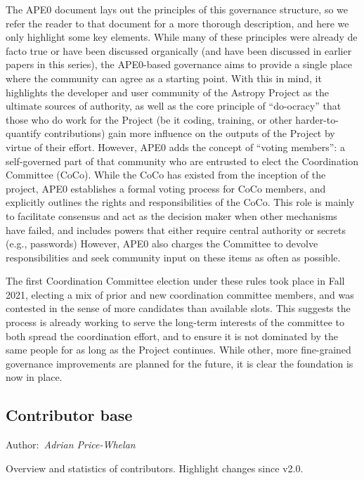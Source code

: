 \documentclass[modern]{aastex631}
\newcommand{\secauthor}[1]{{\color{blue}Author:~\textit{#1}}}
\begin{document}
The APE0 \citep{ape0} document lays out the principles of this governance
structure, so we refer the reader to that document for a more thorough
description, and here we only highlight some key elements. While many of these
principles were already de facto true or have been discussed organically (and
have been discussed in earlier papers in this series), the APE0-based governance
aims to provide a single place where the community can agree as a starting
point. With this in mind, it highlights the developer and user community of the
Astropy Project as the ultimate sources of authority, as well as the core
principle of ``do-ocracy'' that those who do work for the Project (be it coding,
training, or other harder-to-quantify contributions) gain more influence on the
outputs of the Project by virtue of their effort. However, APE0 adds the
concept of ``voting members'': a self-governed part of that community who are
entrusted to elect the Coordination Committee (CoCo). While the CoCo has existed
from the inception of the project, APE0 establishes a formal voting process for
CoCo members, and explicitly outlines the rights and responsibilities of the
CoCo. This role is mainly to facilitate consensus and act as the decision maker
when other mechanisms have failed, and includes powers that either
require central authority or secrets (e.g., passwords) However, APE0 also
charges the Committee to devolve responsibilities and seek community input on
these items as often as possible.

The first Coordination Committee election under these rules took place in Fall
2021, electing a mix of prior and new coordination committee members,
and was contested in the sense of more candidates than available slots. This
suggests the process is already working to serve the long-term interests of the
committee to both spread the coordination effort, and to ensure it is not
dominated by the same people for as long as the Project continues. While other,
more fine-grained governance improvements are planned for the future, it is
clear the foundation is now in place.


\subsection{Contributor base} \label{sec:project-contributors}

\secauthor{Adrian Price-Whelan}

Overview and statistics of contributors. Highlight changes since v2.0.
\end{document}
